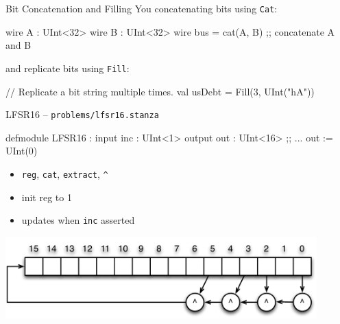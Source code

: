 \documentclass[xcolor=pdflatex,dvipsnames,table]{beamer}
\begin{document}
% 
% 

\begin{frame}[fragile]{Bit Concatenation and Filling}
You concatenating bits using \verb+Cat+:
\begin{stanza}
wire A   : UInt<32>
wire B   : UInt<32>
wire bus = cat(A, B) ;; concatenate A and B
\end{stanza}

and replicate bits using \verb+Fill+:
\begin{stanza}
// Replicate a bit string multiple times.
val usDebt = Fill(3, UInt("hA")) 
\end{stanza}

\end{frame}

\begin{frame}[fragile]{LFSR16 -- \tt problems/lfsr16.stanza}

\begin{stanza}
defmodule LFSR16 :
  input inc : UInt<1>
  output out : UInt<16>
  ;; ...
  out := UInt(0)
\end{stanza}
\begin{itemize}
\item \verb+reg+, \verb+cat+, \verb+extract+, \verb+^+
\item init reg to 1
\item updates when \verb+inc+ asserted
\end{itemize}

\begin{center}
\includegraphics[width=0.9\textwidth]{figs/LFSR16.pdf}
\end{center}

\end{frame}
\end{document}
